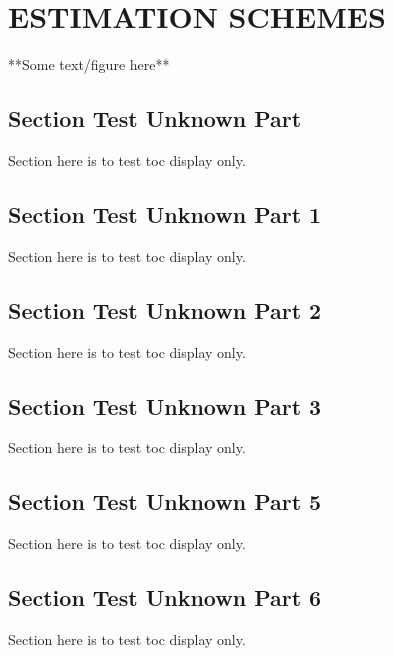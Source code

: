 \chapter{ESTIMATION SCHEMES}

**Some text/figure here**

\section{Section Test Unknown Part}
Section here is to test toc display only.

\section{Section Test Unknown Part 1}
Section here is to test toc display only.

\section{Section Test Unknown Part 2}
Section here is to test toc display only.

\section{Section Test Unknown Part 3}
Section here is to test toc display only.



\section{Section Test Unknown Part 5}
Section here is to test toc display only.

\section{Section Test Unknown Part 6}
Section here is to test toc display only.

